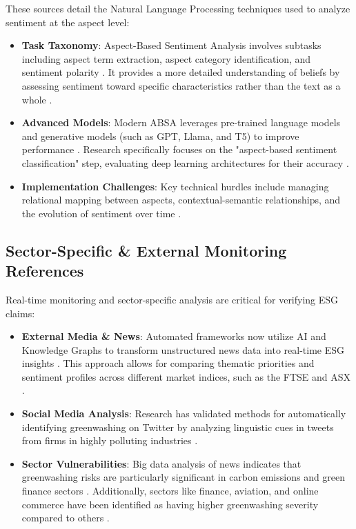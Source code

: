 \documentclass{article}
\begin{document}
These sources detail the Natural Language Processing techniques used to analyze sentiment at the aspect level:
\begin{itemize}
\item 

\textbf{Task Taxonomy}: Aspect-Based Sentiment Analysis involves subtasks including aspect term extraction, aspect category identification, and sentiment polarity  \parencite{wenxuan_zhang_5437e3f3}. It provides a more detailed understanding of beliefs by assessing sentiment toward specific characteristics rather than the text as a whole  \parencite{kabir_kasum_yusuf_c4d30037}.\item 

\textbf{Advanced Models}: Modern ABSA leverages pre-trained language models and generative models (such as GPT, Llama, and T5) to improve performance  \parencite[]{yan_cathy_hua_d165c428, wenxuan_zhang_5437e3f3}. Research specifically focuses on the "aspect-based sentiment classification" step, evaluating deep learning architectures for their accuracy  \parencite{gianni_brauwers_a5890333}.\item 

\textbf{Implementation Challenges}: Key technical hurdles include managing relational mapping between aspects, contextual-semantic relationships, and the evolution of sentiment over time  \parencite{ambreen_nazir_4e58a224}.
\end{itemize}
\subsection*{Sector-Specific \& External Monitoring References}

Real-time monitoring and sector-specific analysis are critical for verifying ESG claims:
\begin{itemize}
\item 

\textbf{External Media \& News}: Automated frameworks now utilize AI and Knowledge Graphs to transform unstructured news data into real-time ESG insights  \parencite{omar_mohmmed_hassan_nassar_b5527512}. This approach allows for comparing thematic priorities and sentiment profiles across different market indices, such as the FTSE and ASX  \parencite{omar_mohmmed_hassan_nassar_b5527512}.\item 

\textbf{Social Media Analysis}: Research has validated methods for automatically identifying greenwashing on Twitter by analyzing linguistic cues in tweets from firms in highly polluting industries  \parencite{divinus_oppong_tawiah_f0317a5d}.\item 

\textbf{Sector Vulnerabilities}: Big data analysis of news indicates that greenwashing risks are particularly significant in carbon emissions and green finance sectors  \parencite{____fbb29d39}. Additionally, sectors like finance, aviation, and online commerce have been identified as having higher greenwashing severity compared to others  \parencite{adriana_anamaria_davidescu_cb161cbb}.
\end{itemize}
\printbibliography
\end{document}

